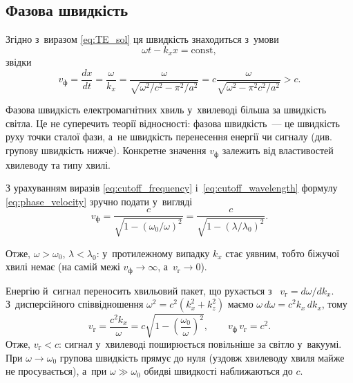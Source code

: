 \subsection*{Фазова швидкість}

Згідно з~виразом \eqref{eq:TE_sol} ця швидкість знаходиться з~умови
\begin{equation}
	\omega t - k_x x = \text{const},
	\label{eq:phase_const}
\end{equation}
звідки
\begin{equation}
	v_\text{ф} = \frac{dx}{dt} = \frac{\omega}{k_x} = \frac{\omega}{\sqrt{\omega^2/c^2 - \pi^2/a^2}} = c \frac{\omega}{\sqrt{\omega^2 - \pi^2 c^2/a^2}} > c.
	\label{eq:phase_velocity}
\end{equation}

\begin{Attention}
	Фазова швидкість електромагнітних хвиль у~хвилеводі більша за швидкість світла. Це не суперечить теорії відносності: фазова швидкість~--- це швидкість руху точки сталої фази, а~не швидкість перенесення енергії чи сигналу (див. групову швидкість нижче). Конкретне значення $v_\text{ф}$ залежить від властивостей хвилеводу та типу хвилі.
\end{Attention}

З урахуванням виразів \eqref{eq:cutoff_frequency} і~\eqref{eq:cutoff_wavelength} формулу \eqref{eq:phase_velocity} зручно подати у~вигляді
\begin{equation}
	v_\text{ф} = \frac{c}{\sqrt{1 - (\omega_0/\omega)^2}} = \frac{c}{\sqrt{1 - (\lambda/\lambda_0)^2}}.
	\label{eq:phase_velocity_relative}
\end{equation}

Отже, $\omega > \omega_0$, $\lambda < \lambda_0$: у~протилежному випадку $k_x$ стає уявним, тобто біжучої хвилі немає (на самій межі $v_\text{ф}\to\infty$, а~$v_\text{г}\to0$).

 Енергію й~сигнал переносить хвильовий пакет, що рухається з~ $v_\text{г}=d\omega/dk_x$. З~дисперсійного співвідношення $\omega^2=c^2(k_x^2+k_z^2)$ маємо $\omega\,d\omega=c^2k_x\,dk_x$, тому
\begin{equation}\label{eq:group_velocity}
	v_\text{г}=\frac{c^2k_x}{\omega}=c\sqrt{1-\left(\frac{\omega_0}{\omega}\right)^2},\qquad v_\text{ф}\,v_\text{г}=c^2.
\end{equation}
Отже, $v_\text{г}<c$: сигнал у~хвилеводі поширюється повільніше за світло у~вакуумі. При $\omega\to\omega_0$ групова швидкість прямує до нуля (уздовж хвилеводу хвиля майже не просувається), а~при $\omega\gg\omega_0$ обидві швидкості наближаються до $c$.

